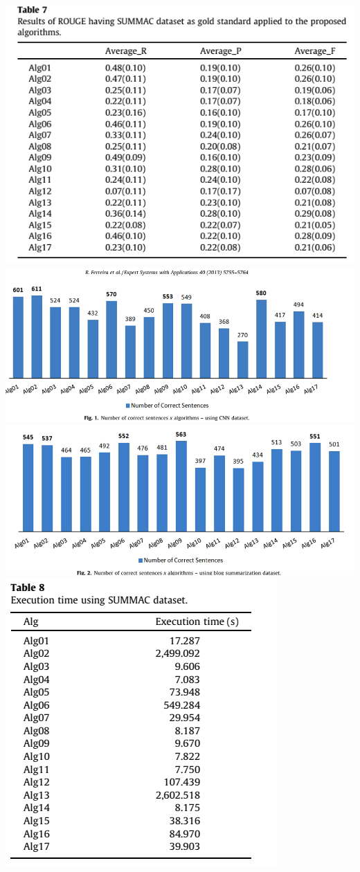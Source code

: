\documentclass[conference]{IEEEtran}
\begin{document}
\includegraphics[scale=.5]{summac1}
\includegraphics[scale=.35]{cnn2}
\includegraphics[scale=.35]{blg2}
\includegraphics[scale=.4]{summac2}
\end{document}
